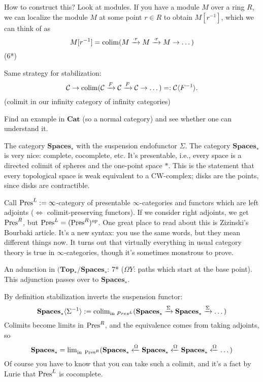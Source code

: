 \documentclass[class=report, crop=false,a4paper,twoside]{standalone}
\begin{document}
How to construct this? Look at modules. If you have a module $M$ over a ring $R$, we can localize the module $M$ at some point $r \in R$ to obtain $M[r^{-1}]$, which we can think of as
\[
M[r^{-1}] = \operatorname{colim}(M \xrightarrow{\cdot r} M \xrightarrow{\cdot r} M \to \dots)
\]
(6*)

Same strategy for stabilization:
\[
\mathcal{C} \to \operatorname{colim}(\mathcal{C} \xrightarrow{F} \mathcal{C} \xrightarrow{F} \mathcal{C} \to \dots) =: \mathcal{C} \langle F^{-1} \rangle.
\]
(colimit in our infinity category of infinity categories)

\begin{exercise}
	Find an example in $\mathbf{Cat}$ (so a normal category) and see whether one can understand it. 
\end{exercise}

\begin{example}
	The category $\mathbf{Spaces}_*$ with the suspension endofunctor $\Sigma$. The category $\mathbf{Spaces}_*$ is very nice: complete, cocomplete, etc. It's presentable, i.e., every space is a directed colimit of spheres and the one-point space $*$. This is the statement that every topological space is weak equivalent to a CW-complex; disks are the points, since disks are contractible.

	Call $\operatorname{Pres}^L := \infty$-category of presentable $\infty$-categories and functors which are left adjoints ($\Leftrightarrow$ colimit-preserving functors). If we consider right adjoints, we get $\operatorname{Pres}^R$, but $\operatorname{Pres}^L = (\operatorname{Pres}^R)^{op}$. One great place to read about this is Zizinski's Bourbaki article. It's a new syntax: you use the same words, but they mean different things now. It turns out that virtually everything in usual category theory is true in $\infty$-categories, though it's sometimes monstrous to prove.

	An adunction in $(\mathbf{Top}_*/\mathbf{Spaces}_*$: 7* ($\Omega Y$: paths which start at the base point). This adjunction passes over to $\mathbf{Spaces}_*$.

	By definition stabilization inverts the suspension functor:
	\[
	\mathbf{Spaces}_*\langle \Sigma^{-1} \rangle := \operatorname{colim}_{\text{in }Pres^L} (\mathbf{Spaces}_* \xrightarrow{\Sigma} \mathbf{Spaces}_* \xrightarrow{\Sigma} \dots)
	\]
	Colimits become limits in $\operatorname{Pres}^R$, and the equivalence comes from taking adjoints, so 
	\[
	\mathbf{Spaces}_* = \operatorname{lim}_{\text{in }\operatorname{Pres}^R} (\mathbf{Spaces}_* \xleftarrow{\Omega} \mathbf{Spaces}_* \xleftarrow{\Omega} \mathbf{Spaces}_* \xleftarrow{\Omega} \dots)
	\]
	Of course you have to know that you can take such a colimit, and it's a fact by Lurie that $\operatorname{Pres}^L$ is cocomplete.


\end{example}
\end{document}
